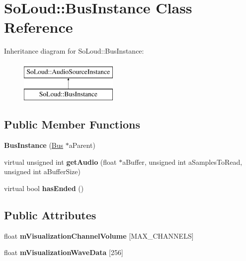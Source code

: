 \hypertarget{class_so_loud_1_1_bus_instance}{}\section{So\+Loud\+::Bus\+Instance Class Reference}
\label{class_so_loud_1_1_bus_instance}
Inheritance diagram for So\+Loud\+::Bus\+Instance\+:\begin{figure}[H]
\begin{center}
\leavevmode
\includegraphics[height=2.000000cm]{class_so_loud_1_1_bus_instance}
\end{center}
\end{figure}
\subsection*{Public Member Functions}
\begin{DoxyCompactItemize}
\item 
\mbox{\label{class_so_loud_1_1_bus_instance_a4bd198344ac6013b8814d6d5a199a39e}} 
{\bfseries Bus\+Instance} (\mbox{\hyperlink{class_so_loud_1_1_bus}{Bus}} $\ast$a\+Parent)
\item 
\mbox{\label{class_so_loud_1_1_bus_instance_ad906afd5fa84885b39565b093ebfdacf}} 
virtual unsigned int {\bfseries get\+Audio} (float $\ast$a\+Buffer, unsigned int a\+Samples\+To\+Read, unsigned int a\+Buffer\+Size)
\item 
\mbox{\label{class_so_loud_1_1_bus_instance_a9343e1e9c73326a570c7cb2e826c1fce}} 
virtual bool {\bfseries has\+Ended} ()
\end{DoxyCompactItemize}
\subsection*{Public Attributes}
\begin{DoxyCompactItemize}
\item 
\mbox{\label{class_so_loud_1_1_bus_instance_a40447d8330396845ebb19b586aad1032}} 
float {\bfseries m\+Visualization\+Channel\+Volume} \mbox{[}M\+A\+X\+\_\+\+C\+H\+A\+N\+N\+E\+LS\mbox{]}
\item 
\mbox{\label{class_so_loud_1_1_bus_instance_a02aa0be39eec9ce8986dbc6e0bc87e2b}} 
float {\bfseries m\+Visualization\+Wave\+Data} \mbox{[}256\mbox{]}
\end{DoxyCompactItemize}
